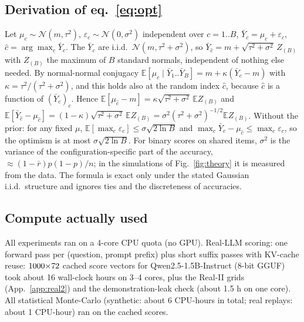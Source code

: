 \subsection{Derivation of eq.~\eqref{eq:opt}}
\label{app:proof}
Let $\mu_c\sim\mathcal N(m,\tau^2)$, $\varepsilon_c\sim\mathcal N(0,\sigma^2)$ independent over $c=1..B$, $\bar Y_c=\mu_c+\varepsilon_c$, $\hat c=\arg\max_c\bar Y_c$. The $\bar Y_c$ are i.i.d.\ $\mathcal N(m,\tau^2+\sigma^2)$, so $\bar Y_{\hat c}=m+\sqrt{\tau^2+\sigma^2}\,Z_{(B)}$ with $Z_{(B)}$ the maximum of $B$ standard normals, independent of nothing else needed. By normal-normal conjugacy $\mathbb{E}[\mu_c\mid\bar Y_1..\bar Y_B]=m+\kappa(\bar Y_c-m)$ with $\kappa=\tau^2/(\tau^2+\sigma^2)$, and this holds also at the random index $\hat c$, because $\hat c$ is a function of $(\bar Y_c)_c$. Hence $\mathbb{E}[\mu_{\hat c}-m]=\kappa\sqrt{\tau^2+\sigma^2}\,\mathbb{E}Z_{(B)}$ and $\mathbb{E}[\bar Y_{\hat c}-\mu_{\hat c}]=(1-\kappa)\sqrt{\tau^2+\sigma^2}\,\mathbb{E}Z_{(B)}=\sigma^2(\tau^2+\sigma^2)^{-1/2}\mathbb{E}Z_{(B)}$. Without the prior: for any fixed $\mu$, $\mathbb{E}[\max_c\varepsilon_c]\le\sigma\sqrt{2\ln B}$ and $\max_c\bar Y_c-\mu_{\hat c}\le\max_c\varepsilon_c$, so the optimism is at most $\sigma\sqrt{2\ln B}$. For binary scores on shared items, $\sigma^2$ is the variance of the configuration-specific part of the accuracy, $\approx(1-\bar r)p(1-p)/n$; in the simulations of Fig.~\ref{fig:theory} it is measured from the data. The formula is exact only under the stated Gaussian i.i.d.\ structure and ignores ties and the discreteness of accuracies.

\subsection{Compute actually used}
All experiments ran on a 4-core CPU quota (no GPU). Real-LLM scoring: one forward pass per (question, prompt prefix) plus short suffix passes with KV-cache reuse: $1000{\times}72$ cached score vectors for Qwen2.5-1.5B-Instruct (8-bit GGUF) took about 16 wall-clock hours on 3--4 cores, plus the Real-II grids (App.~\ref{app:real2}) and the demonstration-leak check (about 1.5 h on one core). All statistical Monte-Carlo (synthetic: about 6 CPU-hours in total; real replays: about 1 CPU-hour) ran on the cached scores.

